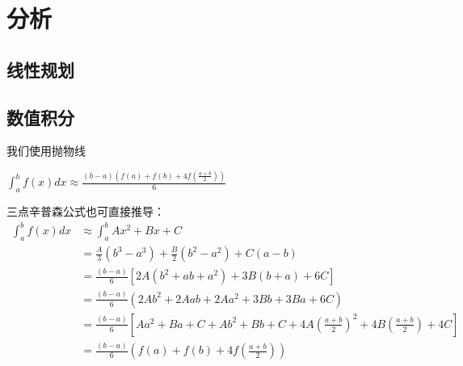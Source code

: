 \section{分析}
\subsection{线性规划}

\subsection{数值积分}
\begin{theorem}[辛普森公式]
	我们使用抛物线
\end{theorem}
\begin{corollary}[三点辛普森公式]
	$\int_a^bf(x)dx\approx\frac{(b-a)(f(a)+f(b)+4f(\frac{a+b}{2}))}{6}$
\end{corollary}
\begin{remark}
	三点辛普森公式也可直接推导：
	\begin{equation}
		\begin{split}
			\int_a^bf(x)dx&\approx\int_a^bAx^2+Bx+C\\
			&=\frac{A}{3}(b^3-a^3)+\frac{B}{2}(b^2-a^2)+C(a-b)\\
			&=\frac{(b-a)}{6}[2A(b^2+ab+a^2)+3B(b+a)+6C]\\
			&=\frac{(b-a)}{6}(2Ab^2+2Aab+2Aa^2+3Bb+3Ba+6C)\\
			&=\frac{(b-a)}{6}[Aa^2+Ba+C+Ab^2+Bb+C+4A(\frac{a+b}{2})^2+4B(\frac{a+b}{2})+4C]\\
			&=\frac{(b-a)}{6}(f(a)+f(b)+4f(\frac{a+b}{2}))
		\end{split}
	\end{equation}
\end{remark}